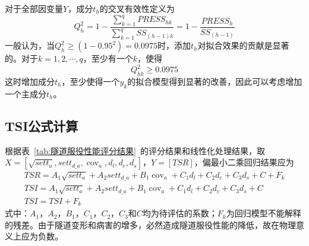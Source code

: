 对于全部因变量$Y$，成分$t_h$的交叉有效性定义为
\begin{equation}
    Q_{h}^{2}=1-\frac{\sum\limits_{k=1}^{q}{PRES{{S}_{hk}}}}{\sum\limits_{k=1}^{q}{S{{S}_{(h-1)k}}}}=1-\frac{PRES{{S}_{h}}}{S{{S}_{(h-1)}}}
\end{equation}
一般认为，当$Q_{h}^{2}\ge (1-{{0.95}^{2}})=0.0975$时，添加$t_h$对拟合效果的贡献是显著的。对于$k=1,2,\cdots ,q$，至少有一个$k$，使得
\begin{equation}
    Q_{hk}^{2}\ge 0.0975
\end{equation}
这时增加成分$t_h$，至少使得一个$y_k$的拟合模型得到显著的改善，因此可以考虑增加一个主成分$t_h$。

\subsection{TSI公式计算}

根据表~\ref{tab:隧道服役性能评分结果}~的评分结果和线性化处理结果，取$X=\left[ \sqrt{set{{t}_{a}}},set{{t}_{d\_a}},{{\operatorname{cov}}_{a}},{{d}_{l}},{{d}_{c}},{{d}_{s}} \right]$，$Y=\left[ TSR \right]$，偏最小二乘回归结果应为
\begin{gather}
    TSR={{A}_{1}}\sqrt{set{{t}_{a}}}+{{A}_{2}}set{{t}_{d\_a}}+{{B}_{1}}{{\operatorname{cov}}_{a}}+{{C}_{1}}{{d}_{l}}+{{C}_{2}}{{d}_{c}}+{{C}_{3}}{{d}_{s}}+C+{{F}_{k}} \\ 
    TSI={{A}_{1}}\sqrt{set{{t}_{a}}}+{{A}_{2}}set{{t}_{d\_a}}+{{B}_{1}}{{\operatorname{cov}}_{a}}+{{C}_{1}}{{d}_{l}}+{{C}_{2}}{{d}_{c}}+{{C}_{3}}{{d}_{s}}+C \\ 
    TSI=TSI+{{F}_{k}}
\end{gather}
式中：$A_1$，$A_2$，$B_1$，$C_1$，$C_2$，$C_3$和$C$均为待评估的系数；$F_k$为回归模型不能解释的残差。由于隧道变形和病害的增多，必然造成隧道服役性能的降低，故在物理意义上应为负数。

